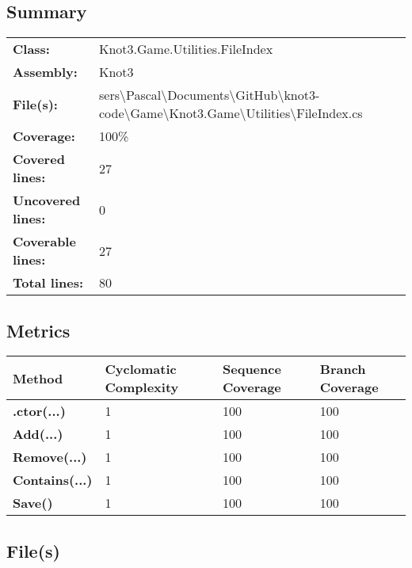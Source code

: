 \documentclass[a4paper,10pt]{article}
\begin{document}
\subsection{Summary}
\begin{longtable}[l]{ll}
\textbf{Class:} & Knot3.Game.Utilities.FileIndex\\
\textbf{Assembly:} & Knot3\\
\textbf{File(s):} & \begin{minipage}[t]{12cm}{sers\textbackslash Pascal\textbackslash Documents\textbackslash GitHub\textbackslash knot3-code\textbackslash Game\textbackslash Knot3.Game\textbackslash Utilities\textbackslash FileIndex.cs}\end{minipage} \\
\textbf{Coverage:} & 100\%\\
\textbf{Covered lines:} & 27\\
\textbf{Uncovered lines:} & 0\\
\textbf{Coverable lines:} & 27\\
\textbf{Total lines:} & 80\\
\end{longtable}
\subsection{Metrics}
\begin{longtable}[l]{|l|l|l|l|}
\hline
\textbf{Method} & \textbf{Cyclomatic Complexity} & \textbf{Sequence Coverage} & \textbf{Branch Coverage}\\
\hline
\textbf{.ctor(...)} & 1 & 100 & 100\\
\hline
\textbf{Add(...)} & 1 & 100 & 100\\
\hline
\textbf{Remove(...)} & 1 & 100 & 100\\
\hline
\textbf{Contains(...)} & 1 & 100 & 100\\
\hline
\textbf{Save()} & 1 & 100 & 100\\
\hline
\end{longtable}
\subsection{File(s)}
\end{document}
